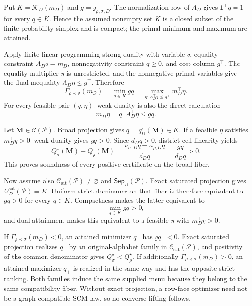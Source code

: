 Put \(K=\mathcal K_D(m_D)\) and \(g=g_{\rho,\sigma,D}\). The normalization row of \(A_D\) gives \(\mathbf 1^\top q=1\) for every \(q\in K\). Hence the assumed nonempty set \(K\) is a closed subset of the finite probability simplex and is compact; the primal minimum and maximum are attained.

Apply finite linear-programming strong duality with variable \(q\), equality constraint \(A_Dq=m_D\), nonnegativity constraint \(q\geq0\), and cost column \(g^\top\). The equality multiplier \(\eta\) is unrestricted, and the nonnegative primal variables give the dual inequality \(A_D^\top\eta\leq g^\top\). Therefore
\[
\Gamma_{\rho\prec\sigma}(m_D)
=\min_{q\in K}gq
=\max_{\eta:A_D^\top\eta\leq g^\top}m_D^\top\eta.
\]
For every feasible pair \((q,\eta)\), weak duality is also the direct calculation
\[
m_D^\top\eta=q^\top A_D^\top\eta\leq gq.
\]

Let \(\mathbf M\in\mathcal C(\mathcal P)\). Broad projection gives \(q=q_D^\star(\mathbf M)\in K\). If a feasible \(\eta\) satisfies \(m_D^\top\eta>0\), weak duality gives \(gq>0\). Since \(d_Dq>0\), district-cell linearity yields
\[
Q_\sigma^\star(\mathbf M)-Q_\rho^\star(\mathbf M)
=\frac{n_{\sigma,D}q-n_{\rho,D}q}{d_Dq}
=\frac{gq}{d_Dq}>0.
\]
This proves soundness of every positive certificate on the broad fiber.

Now assume also \(\mathcal C_{\mathrm{sat}}(\mathcal P)\ne\varnothing\) and \(\mathsf{Sep}_D(\mathcal P)\). Exact saturated projection gives \(\mathcal Q_D^{\mathrm{sat}}(\mathcal P)=K\). Uniform strict dominance on that fiber is therefore equivalent to \(gq>0\) for every \(q\in K\). Compactness makes the latter equivalent to
\[
\min_{q\in K}gq>0,
\]
and dual attainment makes this equivalent to a feasible \(\eta\) with \(m_D^\top\eta>0\).

If \(\Gamma_{\rho\prec\sigma}(m_D)<0\), an attained minimizer \(q_-\) has \(gq_-<0\). Exact saturated projection realizes \(q_-\) by an original-alphabet family in \(\mathcal C_{\mathrm{sat}}(\mathcal P)\), and positivity of the common denominator gives \(Q_\sigma^\star<Q_\rho^\star\). If additionally \(\overline\Gamma_{\rho\prec\sigma}(m_D)>0\), an attained maximizer \(q_+\) is realized in the same way and has the opposite strict ranking. Both families induce the same supplied menu because they belong to the same compatibility fiber. Without exact projection, a row-face optimizer need not be a graph-compatible SCM law, so no converse lifting follows.